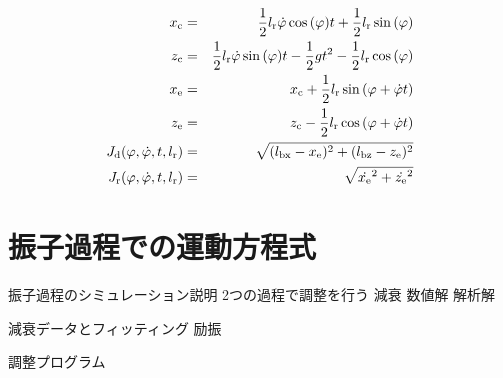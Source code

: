             \begin{eqnarray}
              \equlabel{lr-range}
              x_{\mathrm{c}}&=&\frac{1}{2}l_{\mathrm{r}}\dot{\varphi}\cos{(\varphi)}t+\frac{1}{2}l_{\mathrm{r}}\sin{(\varphi)}\\
              \equlabel{bar}
              z_{\mathrm{c}}&=&\frac{1}{2}l_{\mathrm{r}}\dot{\varphi}\sin{(\varphi)}t-\frac{1}{2}gt^2-\frac{1}{2}l_{\mathrm{r}}\cos{(\varphi)}\\
              \equlabel{x-e}
              x_{\mathrm{e}}&=&x_{\mathrm{c}}+\frac{1}{2}l_{\mathrm{r}}\sin{(\varphi+\dot{\varphi}t)}\\
              \equlabel{z-e}
              z_{\mathrm{e}}&=&z_{\mathrm{c}}-\frac{1}{2}l_{\mathrm{r}}\cos{(\varphi+\dot{\varphi}t)}\\
              \equlabel{Jd}
                J_{\mathrm{d}}(\varphi,\dot{\varphi},t,l_{\mathrm{r}})
                &=&\sqrt{(l_{\mathrm{bx}}-x_{\mathrm{e}})^2+(l_{\mathrm{bz}}-z_{\mathrm{e}})^2}\\
              \equlabel{Jr}
              J_{\mathrm{r}}(\varphi,\dot{\varphi},t,l_{\mathrm{r}})
              &=&\sqrt{\dot{x_{\mathrm{e}}}^2+\dot{z_{\mathrm{e}}}^2}
            \end{eqnarray} 
        \section{振子過程での運動方程式}
        振子過程のシミュレーション説明
        2つの過程で調整を行う
          減衰
            数値解  
            解析解
            
            減衰データとフィッティング
          励振

          調整プログラム


